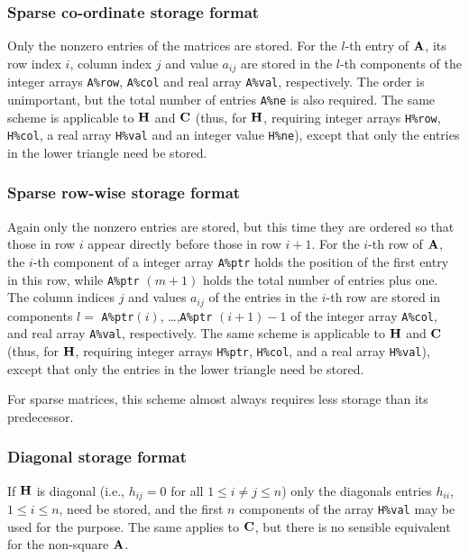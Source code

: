 \documentclass{galahad}
\begin{document}
\subsubsection{Sparse co-ordinate storage format}\label{coordinate}
Only the nonzero entries of the matrices are stored. For the 
$l$-th entry of ${\mathbf{A}}$, its row index $i$, column index $j$ 
and value $a_{ij}$
are stored in the $l$-th components of the integer arrays {\tt A\%row}, 
{\tt A\%col} and real array {\tt A\%val}, respectively.
The order is unimportant, but the total
number of entries {\tt A\%ne} is also required. 
The same scheme is applicable to ${\mathbf{H}}$ and ${\mathbf{C}}$ 
(thus, for ${\mathbf{H}}$, requiring integer arrays {\tt H\%row}, {\tt H\%col}, a real 
array  {\tt H\%val} and an integer value {\tt H\%ne}),
except that only the entries in the lower triangle need be stored.

\subsubsection{Sparse row-wise storage format}\label{rowwise}
Again only the nonzero entries are stored, but this time
they are ordered so that those in row $i$ appear directly before those
in row $i+1$. For the $i$-th row of ${\mathbf{A}}$, the $i$-th component of a 
integer array {\tt A\%ptr} holds the position of the first entry in this row,
while {\tt A\%ptr} $(m+1)$ holds the total number of entries plus one.
The column indices $j$ and values $a_{ij}$ of the entries in the $i$-th row 
are stored in components 
$l =$ {\tt A\%ptr}$(i)$, \ldots ,{\tt A\%ptr} $(i+1)-1$ of the 
integer array {\tt A\%col}, and real array {\tt A\%val}, respectively. 
The same scheme is applicable to
${\mathbf{H}}$ and ${\mathbf{C}}$ (thus, for ${\mathbf{H}}$, 
requiring integer arrays {\tt H\%ptr}, {\tt H\%col}, and 
a real array {\tt H\%val}),
except that only the entries in the lower triangle need be stored.

For sparse matrices, this scheme almost always requires less storage than 
its predecessor.

\subsubsection{Diagonal storage format}\label{diagonal}
If ${\mathbf{H}}$ is diagonal (i.e., $h_{ij} = 0$ for all $1 \leq i \neq j \leq n$)
only the diagonals entries $h_{ii}$, $1 \leq i \leq n$,  need be stored,
and the first $n$ components of the array {\tt H\%val} may be used for 
the purpose. The same applies to ${\mathbf{C}}$, but
there is no sensible equivalent for the non-square ${\mathbf{A}}$.
\end{document}
